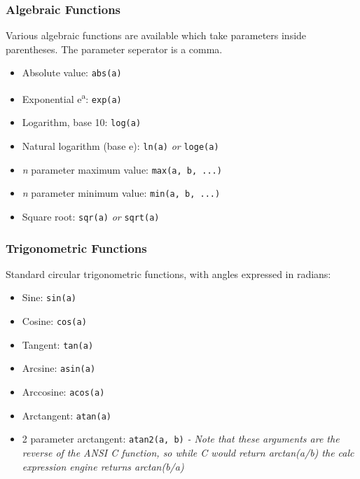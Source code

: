 \subsubsection{Algebraic Functions}

Various algebraic functions are available which take parameters inside parentheses. The parameter seperator is a comma.

\begin{itemize}
\item Absolute value: \verb|abs(a)|

\item Exponential e\textsuperscript{a}: \verb|exp(a)|

\item Logarithm, base 10: \verb|log(a)|

\item Natural logarithm (base e): \verb|ln(a)| \emph{or} \verb|loge(a)|

\item \emph{n} parameter maximum value: \verb|max(a, b, ...)|

\item \emph{n} parameter minimum value: \verb|min(a, b, ...)|

\item Square root: \verb|sqr(a)| \emph{or} \verb|sqrt(a)|

\end{itemize}

\subsubsection{Trigonometric Functions}

Standard circular trigonometric functions, with angles expressed in radians:

\begin{itemize}
\item Sine: \verb|sin(a)|

\item Cosine: \verb|cos(a)|

\item Tangent: \verb|tan(a)|

\item Arcsine: \verb|asin(a)|

\item Arccosine: \verb|acos(a)|

\item Arctangent: \verb|atan(a)|

\item 2 parameter arctangent: \verb|atan2(a, b)| \emph{- Note that these arguments are the reverse of the ANSI C function, so while C would return arctan(a/b) the calc expression engine returns arctan(b/a)}

\end{itemize}

